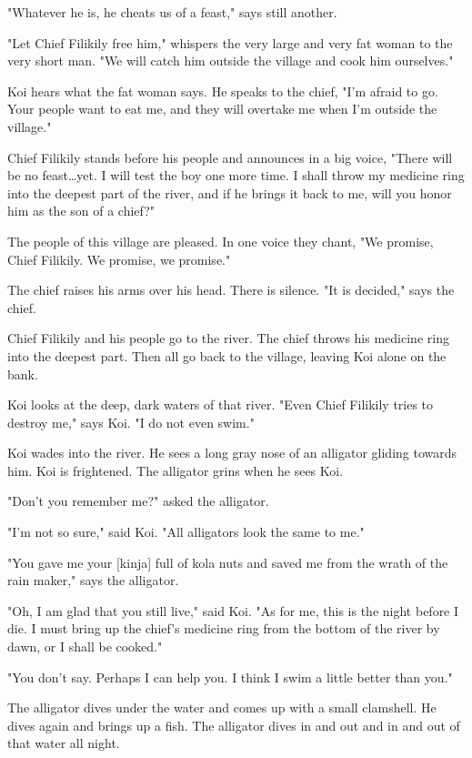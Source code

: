 "Whatever he is, he cheats us of a feast," says still another.

"Let Chief Filikily free him," whispers the very large and very fat woman to the very short man. "We will catch him outside the village and cook him ourselves."

Koi hears what the fat woman says. He speaks to the chief, "I'm afraid to go. Your people want to eat me, and they will overtake me when I'm outside the village."

Chief Filikily stands before his people and announces in a big voice, "There will be no feast\dots yet. I will test the boy one more time. I shall throw my medicine ring into the deepest part of the river, and if he brings it back to me, will you honor him as the son of a chief?"

The people of this village are pleased. In one voice they chant, "We promise, Chief Filikily. We promise, we promise."

The chief raises his arms over his head. There is silence. "It is decided," says the chief.

Chief Filikily and his people go to the river. The chief throws his medicine ring into the deepest part. Then all go back to the village, leaving Koi alone on the bank.

Koi looks at the deep, dark waters of that river. "Even Chief Filikily tries to destroy me," says Koi. "I do not even swim."

Koi wades into the river. He sees a long gray nose of an alligator gliding towards him. Koi is frightened. The alligator grins when he sees Koi.

"Don't you remember me?" asked the alligator.

"I'm not so sure," said Koi. "All alligators look the same to me."

"You gave me your [kinja] full of kola nuts and saved me from the wrath of the rain maker," says the alligator.

"Oh, I am glad that you still live," said Koi. "As for me, this is the night before I die. I must bring up the chief's medicine ring from the bottom of the river by dawn, or I shall be cooked."

"You don't say. Perhaps I can help you. I think I swim a little better than you."

The alligator dives under the water and comes up with a small clamshell. He dives again and brings up a fish. The alligator dives in and out and in and out of that water all night.

